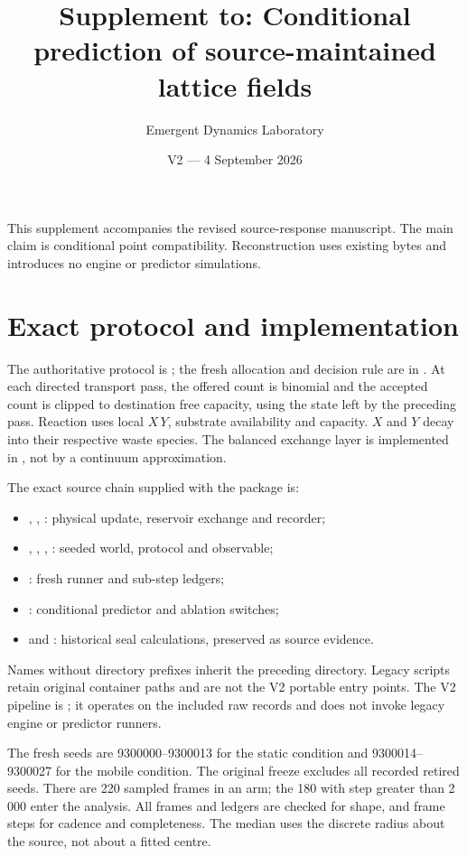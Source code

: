 \documentclass[11pt]{article}
\title{\bfseries Supplement to: Conditional prediction of source-maintained lattice fields}
\author{Emergent Dynamics Laboratory}
\date{V2 --- 4 September 2026}
\begin{document}
\maketitle
This supplement accompanies the revised source-response manuscript. The main claim is conditional
point compatibility. Reconstruction uses existing bytes and introduces no engine or predictor simulations.

\section{Exact protocol and implementation}
The authoritative protocol is ; the fresh allocation and
decision rule are in .
At each directed transport pass, the offered count is binomial and the accepted count is
clipped to destination free capacity, using the state left by the preceding pass.
Reaction uses local $X\,Y$, substrate availability and capacity. $X$ and $Y$ decay into their
respective waste species. The balanced exchange layer is implemented in
, not by a continuum approximation.

The exact source chain supplied with the package is:
\begin{itemize}
\item {}, , : physical update,
reservoir exchange and recorder;
\item {}, ,
, : seeded world, protocol and observable;
\item {}: fresh runner and sub-step ledgers;
\item {}: conditional predictor and ablation switches;
\item {} and :
historical seal calculations, preserved as source evidence.
\end{itemize}
Names without directory prefixes inherit the preceding directory.
Legacy scripts retain original container paths and are not the V2 portable entry points.
The V2 pipeline is ; it operates on the included raw records and
does not invoke legacy engine or predictor runners.

The fresh seeds are 9300000--9300013 for the static condition and 9300014--9300027 for the
mobile condition. The original freeze excludes all recorded retired seeds.
There are 220 sampled frames in an arm; the 180 with step greater than 2\,000 enter the
analysis. All frames and ledgers are checked for shape, and frame steps for cadence and completeness.
The median uses the discrete radius about the source, not about a fitted centre.
\end{document}
